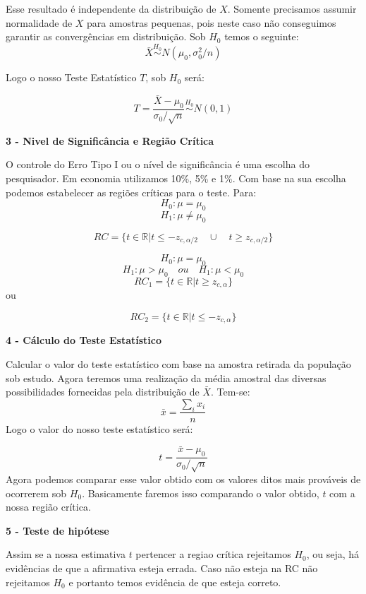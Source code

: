 \documentclass[
  letterpaper,
  DIV=11,
  numbers=noendperiod]{scrartcl}
\begin{document}
Esse resultado é independente da distribuição de \(X\). Somente
precisamos assumir normalidade de \(X\) para amostras pequenas, pois
neste caso não conseguimos garantir as convergências em distribuição.
Sob \(H_0\) temos o seguinte:
\[\bar{X}\overset{H_0}{\sim} N(\mu_0,\sigma_0^2/n)\]

Logo o nosso Teste Estatístico \(T\), sob \(H_0\) será:

\[T=\frac{\bar{X}-\mu_0}{\sigma_0/\sqrt{n}}\overset{H_0}{\sim} N(0,1)\]

\vspace{0.5cm}

\textbf{3 - Nivel de Significância e Região Crítica}

O controle do Erro Tipo I ou o nível de significância é uma escolha do
pesquisador. Em economia utilizamos 10\%, 5\% e 1\%. Com base na sua
escolha podemos estabelecer as regiões críticas para o teste. Para:
\[H_0: \mu=\mu_0\] \[H_1: \mu \neq \mu_0\]

\[RC=\{t \in \mathbb{R} |t\leq - z_{c,\alpha/2} \quad \cup \quad t\geq  z_{c,\alpha/2}\}\]

\[H_0: \mu=\mu_0\] \[H_1: \mu >\mu_0 \quad ou \quad H_1: \mu<\mu_0\]
\[RC_1=\{t \in \mathbb{R} | t\geq  z_{c,\alpha}\}\] ou

\[RC_2=\{t \in \mathbb{R} |t\leq - z_{c,\alpha} \}\]

\vspace{0.5cm}

\textbf{4 - Cálculo do Teste Estatístico}

Calcular o valor do teste estatístico com base na amostra retirada da
população sob estudo. Agora teremos uma realização da média amostral das
diversas possibilidades fornecidas pela distribuição de \(\bar{X}\).
Tem-se: \[\bar{x}=\frac{\sum_i{x_i}}{n}\] Logo o valor do nosso teste
estatístico será:

\[t=\frac{\bar{x}-\mu_0}{\sigma_0/\sqrt{n}}\] Agora podemos comparar
esse valor obtido com os valores ditos mais prováveis de ocorrerem sob
\(H_0\). Basicamente faremos isso comparando o valor obtido, \(t\) com a
nossa região crítica.

\vspace{0.5cm}

\textbf{5 - Teste de hipótese}

Assim se a nossa estimativa \(t\) pertencer a regiao crítica rejeitamos
\(H_0\), ou seja, há evidências de que a afirmativa esteja errada. Caso
não esteja na RC não rejeitamos \(H_0\) e portanto temos evidência de
que esteja correto.
\end{document}
